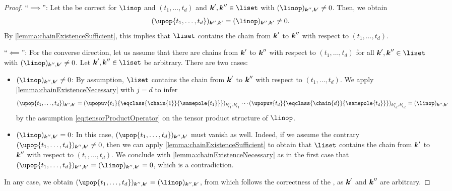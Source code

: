 \begin{proof}
  ``$\implies$'':
  Let the \up be correct for $\linop$ and $(t_1, \dotsc, t_d)$
  and $\*k', \*k'' \in \liset$ with $(\linop)_{\*k'',\*k'} \not= 0$.
  Then, we obtain
  \begin{equation}
    (\upop{t_1,\dotsc,t_d})_{\*k'',\*k'}
    = (\linop)_{\*k'',\*k'}
    \not= 0.
  \end{equation}
  By \cref{lemma:chainExistenceSufficient},
  this implies that $\liset$ contains the chain from ${\boldsymbol{k}}'$ to ${\boldsymbol{k}}''$
  with respect to $(t_1, \dotsc, t_d)$.
  
  ``$\impliedby$'':
  For the converse direction, let us assume that there are chains
  from ${\boldsymbol{k}}'$ to ${\boldsymbol{k}}''$ with respect to $(t_1, \dotsc, t_d)$
  for all $\*k', \*k'' \in \liset$ with $(\linop)_{\*k'',\*k'} \not= 0$.
  Let $\*k', \*k'' \in \liset$ be arbitrary.
  There are two cases:
  \begin{itemize}
    \item
    $(\linop)_{\*k'',\*k'} \not= 0$:
    By assumption, $\liset$ contains the chain from ${\boldsymbol{k}}'$ to ${\boldsymbol{k}}''$
    with respect to $(t_1, \dotsc, t_d)$.
    We apply \cref{lemma:chainExistenceNecessary} with $j = d$
    to infer
    \begin{equation}
      (\upop{t_1,\dotsc,t_d})_{\*k'',\*k'}
      =
      (\upopuv{t_1}{\eqclass{\chain{1}}{\samepole{t_1}}})_{k''_{t_1},k'_{t_1}}
      \dotsm
      (\upopuv{t_d}{\eqclass{\chain{d}}{\samepole{t_d}}})_{k''_{t_d},k'_{t_d}}
      = (\linop)_{\*k'',\*k'}
    \end{equation}
    by the assumption \cref{eq:tensorProductOperator} on
    the tensor product structure of $\linop$.
    
    \item
    $(\linop)_{\*k'',\*k'} = 0$:
    In this case, $(\upop{t_1,\dotsc,t_d})_{\*k'',\*k'}$ must vanish as well.
    Indeed, if we assume the contrary
    $(\upop{t_1,\dotsc,t_d})_{\*k'',\*k'} \not= 0$,
    then we can apply \cref{lemma:chainExistenceSufficient}
    to obtain that $\liset$ contains the chain from ${\boldsymbol{k}}'$ to ${\boldsymbol{k}}''$
    with respect to $(t_1, \dotsc, t_d)$.
    We conclude with \cref{lemma:chainExistenceNecessary} as in the first case
    that $(\upop{t_1,\dotsc,t_d})_{\*k'',\*k'} = (\linop)_{\*k'',\*k'} = 0$,
    which is a contradiction.
  \end{itemize}
  In any case, we obtain
  $(\upop{t_1,\dotsc,t_d})_{\*k'',\*k'} = (\linop)_{\*k'',\*k'}$,
  from which follows the correctness of the \up,
  as ${\boldsymbol{k}}'$ and ${\boldsymbol{k}}''$ are arbitrary.
\end{proof}
